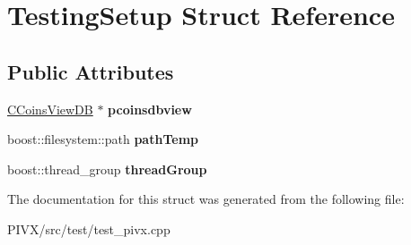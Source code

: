 \hypertarget{struct_testing_setup}{}\section{Testing\+Setup Struct Reference}
\label{struct_testing_setup}
\subsection*{Public Attributes}
\begin{DoxyCompactItemize}
\item 
\mbox{\label{struct_testing_setup_aa2a38ad37e6f135c4dcc56be35474afb}} 
\mbox{\hyperlink{class_c_coins_view_d_b}{C\+Coins\+View\+DB}} $\ast$ {\bfseries pcoinsdbview}
\item 
\mbox{\label{struct_testing_setup_ae209499b85cae3e564bcf311692ff009}} 
boost\+::filesystem\+::path {\bfseries path\+Temp}
\item 
\mbox{\label{struct_testing_setup_adb1cab11de94a3b08a682987d039e1ec}} 
boost\+::thread\+\_\+group {\bfseries thread\+Group}
\end{DoxyCompactItemize}


The documentation for this struct was generated from the following file\+:\begin{DoxyCompactItemize}
\item 
P\+I\+V\+X/src/test/test\+\_\+pivx.\+cpp\end{DoxyCompactItemize}
